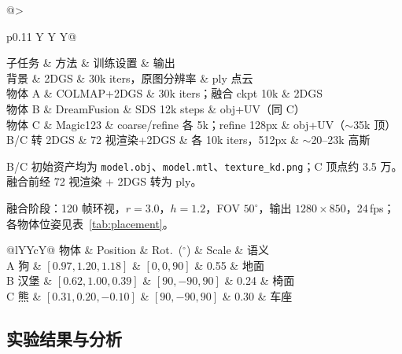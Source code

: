 \documentclass[10pt,twocolumn,letterpaper]{article}
\newcommand{\cvprtable}[1]{%
  \scriptsize
  \setlength{\tabcolsep}{2.5pt}%
  \renewcommand{\arraystretch}{1.08}%
  #1%
}
\begin{document}
\begin{table}[t]
  \centering
  \caption{题目一各子任务训练与生成设置。}
  \label{tab:task1_train}
  \cvprtable{%
  \setlength{\tabcolsep}{2pt}%
  \renewcommand{\arraystretch}{1.12}%
  \begin{tabularx}{\linewidth}{@{}>{\raggedright\arraybackslash}p{0.11\linewidth} Y Y Y@{}}
    \toprule
    子任务 & 方法 & 训练设置 & 输出 \\
    \midrule
    背景 & 2DGS & 30k iters，原图分辨率 & ply 点云 \\
    物体 A & COLMAP+2DGS & 30k iters；融合 ckpt 10k & 2DGS \\
    物体 B & DreamFusion & SDS 12k steps & obj+UV（同 C） \\
    物体 C & Magic123 & coarse/refine 各 5k；refine 128px & obj+UV（$\sim$35k 顶） \\
    B/C 转 2DGS & 72 视渲染+2DGS & 各 10k iters，512px & $\sim$20--23k 高斯 \\
    \bottomrule
  \end{tabularx}%
  }
  \vspace{1pt}
  {\footnotesize B/C 初始资产均为 \texttt{model.obj}、\texttt{model.mtl}、\texttt{texture\_kd.png}；C 顶点约 3.5 万。融合前经 72 视渲染 + 2DGS 转为 ply。}
\end{table}

融合阶段：120 帧环视，$r{=}3.0$，$h{=}1.2$，FOV $50^\circ$，输出 $1280{\times}850$，24\,fps；各物体位姿见表~\ref{tab:placement}。

\begin{table}[t]
  \centering
  \caption{融合场景物体位姿（\texttt{task1.yaml}，$Y$ 向上）。}
  \label{tab:placement}
  \cvprtable{%
  \begin{tabularx}{\linewidth}{@{}lYYcY@{}}
    \toprule
    物体 & Position & Rot.\ ($^\circ$) & Scale & 语义 \\
    \midrule
    A 狗 & \scriptsize $[0.97, 1.20, 1.18]$ & \scriptsize $[0,0,90]$ & 0.55 & 地面 \\
    B 汉堡 & \scriptsize $[0.62, 1.00, 0.39]$ & \scriptsize $[90,-90,90]$ & 0.24 & 椅面 \\
    C 熊 & \scriptsize $[0.31, 0.20, -0.10]$ & \scriptsize $[90,-90,90]$ & 0.30 & 车座 \\
    \bottomrule
  \end{tabularx}%
  }
\end{table}

\subsection{实验结果与分析}
\label{sec:task1_results}
\end{document}
